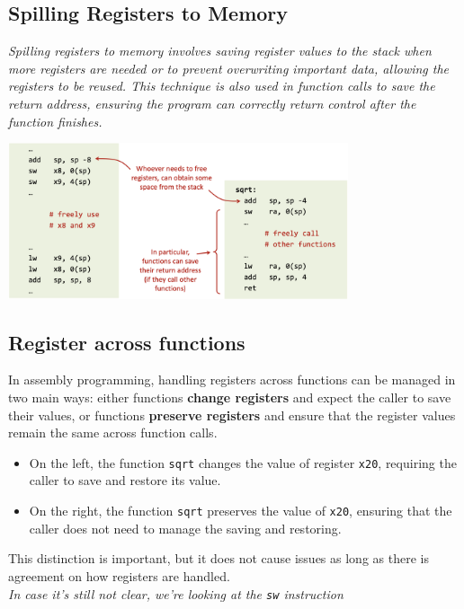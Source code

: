 \subsection{Spilling Registers to Memory}
\textit{Spilling registers to memory involves saving register values to the stack when more registers are needed or to prevent overwriting important data, allowing the registers to be reused. This technique is also used in function calls to save the return address, ensuring the program can correctly return control after the function finishes.}
\begin{center}
    \includegraphics[width=0.75\textwidth]{chapters/chapter1b/images/spilling.png}
\end{center}

\subsection{Register across functions}
In assembly programming, handling registers across functions can be managed in two main ways: either functions \textbf{change registers} and expect the caller to save their values, or functions \textbf{preserve registers} and ensure that the register values remain the same across function calls.

\begin{itemize}
    \item On the left, the function \texttt{sqrt} changes the value of register \texttt{x20}, requiring the caller to save and restore its value.
    \item On the right, the function \texttt{sqrt} preserves the value of \texttt{x20}, ensuring that the caller does not need to manage the saving and restoring.
\end{itemize}

This distinction is important, but it does not cause issues as long as there is agreement on how registers are handled. \\
\textit{In case it's still not clear, we're looking at the \texttt{sw} instruction}

